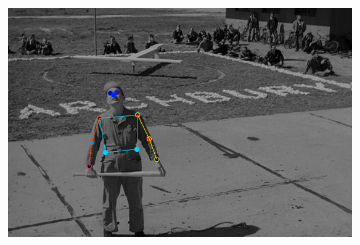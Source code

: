 \begin{figure}[t!]
\begin{subfigure}[b]{0.115\textwidth}
    \end{subfigure}
    \hfill
    \begin{subfigure}[b]{0.115\textwidth}
            \includegraphics[width=\textwidth]{resources/MotivativeAnnotation/FLIC/bad_anno-4}
    \end{subfigure}
    \\
    \begin{subfigure}[b]{0.115\textwidth}

\end{subfigure}
\end{figure}
